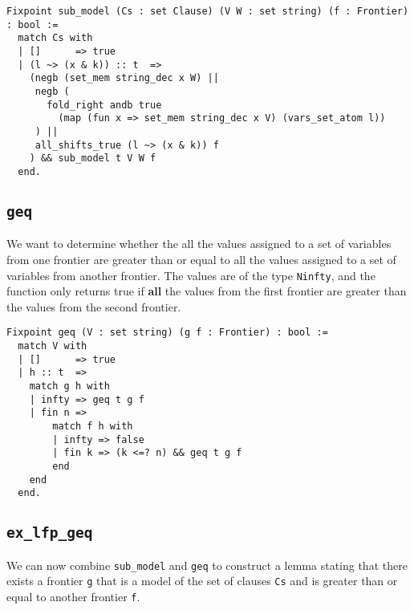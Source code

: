 \begin{minipage}{\linewidth}
\begin{lstlisting}[language=Coq, label={lst:sub_model_def}, caption={Def. of \lstinline{sub_model}}]
Fixpoint sub_model (Cs : set Clause) (V W : set string) (f : Frontier) : bool :=
  match Cs with
  | []      => true
  | (l ~> (x & k)) :: t  =>
    (negb (set_mem string_dec x W) ||
     negb (
       fold_right andb true
         (map (fun x => set_mem string_dec x V) (vars_set_atom l))
     ) ||
     all_shifts_true (l ~> (x & k)) f
    ) && sub_model t V W f
  end.
\end{lstlisting}
\end{minipage}

\subsection{\lstinline{geq}}

We want to determine whether the all the values assigned to a set of variables
from one frontier are greater than or equal to all the values assigned to a set of variables
from another frontier. The values are of the type \lstinline{Ninfty}, and the function
only returns true if \textbf{all} the values from the first frontier are greater than
the values from the second frontier.

\begin{minipage}{\linewidth}
\begin{lstlisting}[language=Coq, label={lst:geq_def}, caption={Def. of \lstinline{geq}}]
Fixpoint geq (V : set string) (g f : Frontier) : bool :=
  match V with
  | []      => true
  | h :: t  =>
    match g h with
    | infty => geq t g f
    | fin n =>
        match f h with
        | infty => false
        | fin k => (k <=? n) && geq t g f
        end
    end
  end.
\end{lstlisting}
\end{minipage}

\subsection{\lstinline{ex_lfp_geq}}

We can now combine \lstinline{sub_model} and \lstinline{geq} to construct a lemma
stating that there exists a frontier \lstinline{g} that is a model of the set of clauses \lstinline{Cs}
and is greater than or equal to another frontier \lstinline{f}.

